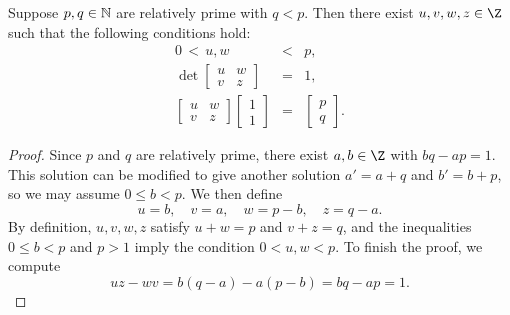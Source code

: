 \begin{lemma}\label{lemma_diophantine}
	Suppose $p,q \in \mathbb{N}$ are relatively prime with $q < p$. Then there exist $u,v,w,z \in \Z$ such that the following conditions hold:
	\begin{eqnarray*}
	0 \,<\, u, w &<& p, \\
	\det\left[ \begin{array}{cc} u&w\\v&z\end{array}\right] &=& 1, \\
	\left[ \begin{array}{cc} u&w\\v&z\end{array}\right]\left[\begin{array}{c}1\\1\end{array}\right] &=& \left[ \begin{array}{c}p\\q\end{array}\right].
	\end{eqnarray*}
\end{lemma}
\begin{proof}
	Since $p$ and $q$ are relatively prime, there exist $a,b \in \Z$ with $ bq - ap = 1$. This solution can be modified to give another solution $a' = a + q$ and $b' = b + p$, so we may assume $0 \leq b < p$. We then define 
	\[
	u=b,\quad v=a,\quad w=p-b,\quad z=q-a.
	\]
	By definition, $u,v,w,z$ satisfy $u + w = p$ and $v + z = q$, and the inequalities $0 \leq b < p$ and $p > 1$ imply the condition $0 < u, w < p$. To finish the proof, we compute
	\[
	uz - wv = b(q-a) - a(p-b) = bq - ap = 1.
	\]
\end{proof}

